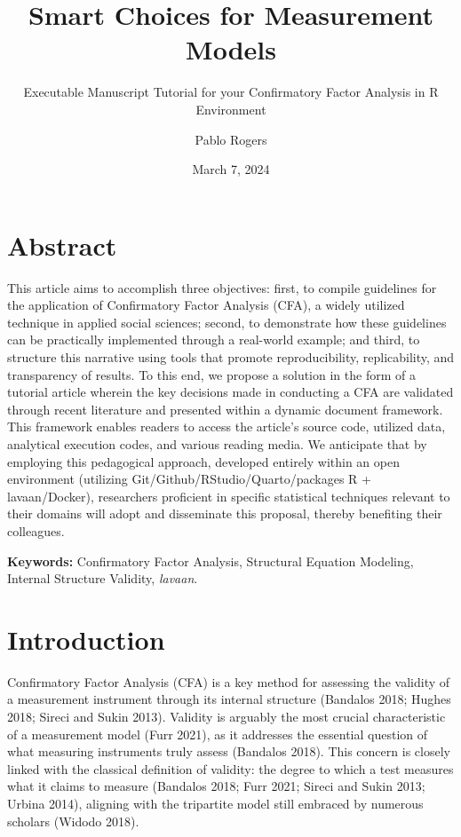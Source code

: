 \documentclass[
  a4paper,
]{article}
\title{Smart Choices for Measurement Models}
\subtitle{Executable Manuscript Tutorial for your Confirmatory Factor
Analysis in R Environment}
\author{Pablo Rogers}
\date{March 7, 2024}
\begin{document}
\maketitle


\section*{Abstract}\label{abstract}


This article aims to accomplish three objectives: first, to compile
guidelines for the application of Confirmatory Factor Analysis (CFA), a
widely utilized technique in applied social sciences; second, to
demonstrate how these guidelines can be practically implemented through
a real-world example; and third, to structure this narrative using tools
that promote reproducibility, replicability, and transparency of
results. To this end, we propose a solution in the form of a tutorial
article wherein the key decisions made in conducting a CFA are validated
through recent literature and presented within a dynamic document
framework. This framework enables readers to access the article's source
code, utilized data, analytical execution codes, and various reading
media. We anticipate that by employing this pedagogical approach,
developed entirely within an open environment (utilizing
Git/Github/RStudio/Quarto/packages R + lavaan/Docker), researchers
proficient in specific statistical techniques relevant to their domains
will adopt and disseminate this proposal, thereby benefiting their
colleagues.

\textbf{Keywords:} Confirmatory Factor Analysis, Structural Equation
Modeling, Internal Structure Validity, \emph{lavaan}.


\section{Introduction}\label{introduction}

Confirmatory Factor Analysis (CFA) is a key method for assessing the
validity of a measurement instrument through its internal structure
(Bandalos 2018; Hughes 2018; Sireci and Sukin 2013). Validity is
arguably the most crucial characteristic of a measurement model (Furr
2021), as it addresses the essential question of what measuring
instruments truly assess (Bandalos 2018). This concern is closely linked
with the classical definition of validity: the degree to which a test
measures what it claims to measure (Bandalos 2018; Furr 2021; Sireci and
Sukin 2013; Urbina 2014), aligning with the tripartite model still
embraced by numerous scholars (Widodo 2018).
\end{document}
